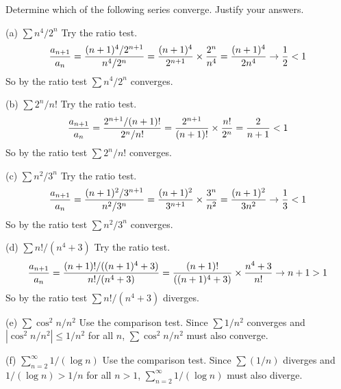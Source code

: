 
Determine which of the following series converge.
Justify your answers.

\medskip
(a) $\sum n^4/2^n$
\medskip
Try the ratio test.
$$
{a_{n+1}\over a_n}
={(n+1)^4/2^{n+1}\over n^4/2^n}
={(n+1)^4\over2^{n+1}}\times{2^n\over n^4}
={(n+1)^4\over2n^4}\rightarrow{1\over2}<1
$$
So by the ratio test $\sum n^4/2^n$ converges.

\medskip
(b) $\sum2^n/n!$
\medskip
Try the ratio test.
$$
{a_{n+1}\over a_n}={2^{n+1}/(n+1)!\over 2^n/n!}
={2^{n+1}\over(n+1)!}\times{n!\over2^n}={2\over n+1}<1
$$
So by the ratio test $\sum2^n/n!$ converges.

\medskip
(c) $\sum n^2/3^n$
\medskip
Try the ratio test.
$$
{a_{n+1}\over a_n}
={(n+1)^2/3^{n+1}\over n^2/3^n}
={(n+1)^2\over 3^{n+1}}\times{3^n\over n^2}
={(n+1)^2\over3n^2}\rightarrow{1\over3}<1
$$
So by the ratio test $\sum n^2/3^n$ converges.

\medskip
(d) $\sum n!/(n^4+3)$
\medskip
Try the ratio test.
$$
{a_{n+1}\over a_n}
={(n+1)!/((n+1)^4+3)\over n!/(n^4+3)}
={(n+1)!\over((n+1)^4+3)}\times{n^4+3\over n!}
\rightarrow n+1>1
$$
So by the ratio test $\sum n!/(n^4+3)$ diverges.

\medskip
(e) $\sum\cos^2 n/n^2$
\medskip
Use the comparison test.
Since $\sum1/n^2$ converges and
$|\cos^2 n/n^2|\le1/n^2$ for all $n$, $\sum\cos^2 n/n^2$ must also converge.

\medskip
(f) $\sum_{n=2}^\infty1/(\log n)$
\medskip
Use the comparison test.
Since $\sum(1/n)$ diverges and $1/(\log n)>1/n$ for all $n>1$,
$\sum_{n=2}^\infty1/(\log n)$ must also diverge.